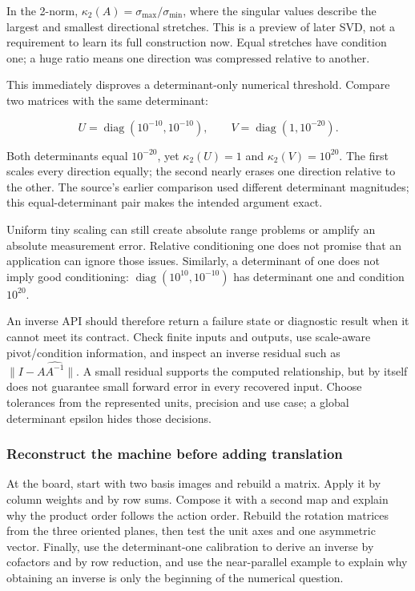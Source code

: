 In the 2-norm, \(\kappa_2(A)=\sigma_{\max}/\sigma_{\min}\), where the singular values describe the largest and smallest directional stretches. This is a preview of later SVD, not a requirement to learn its full construction now. Equal stretches have condition one; a huge ratio means one direction was compressed relative to another.

This immediately disproves a determinant-only numerical threshold. Compare two matrices with the same determinant:

\[
U=\operatorname{diag}(10^{-10},10^{-10}),\qquad
V=\operatorname{diag}(1,10^{-20}).
\]

Both determinants equal \(10^{-20}\), yet \(\kappa_2(U)=1\) and \(\kappa_2(V)=10^{20}\). The first scales every direction equally; the second nearly erases one direction relative to the other. The source's earlier comparison used different determinant magnitudes; this equal-determinant pair makes the intended argument exact.

Uniform tiny scaling can still create absolute range problems or amplify an absolute measurement error. Relative conditioning one does not promise that an application can ignore those issues. Similarly, a determinant of one does not imply good conditioning: \(\operatorname{diag}(10^{10},10^{-10})\) has determinant one and condition \(10^{20}\).

An inverse API should therefore return a failure state or diagnostic result when it cannot meet its contract. Check finite inputs and outputs, use scale-aware pivot/condition information, and inspect an inverse residual such as \(\|I-A\widehat{A^{-1}}\|\). A small residual supports the computed relationship, but by itself does not guarantee small forward error in every recovered input. Choose tolerances from the represented units, precision and use case; a global determinant epsilon hides those decisions.

\subsubsection{Reconstruct the machine before adding translation}\label{01-foundations-i-ch018-reconstruct-the-machine-before-adding-translation}

At the board, start with two basis images and rebuild a matrix. Apply it by column weights and by row sums. Compose it with a second map and explain why the product order follows the action order. Rebuild the rotation matrices from the three oriented planes, then test the unit axes and one asymmetric vector. Finally, use the determinant-one calibration to derive an inverse by cofactors and by row reduction, and use the near-parallel example to explain why obtaining an inverse is only the beginning of the numerical question.

